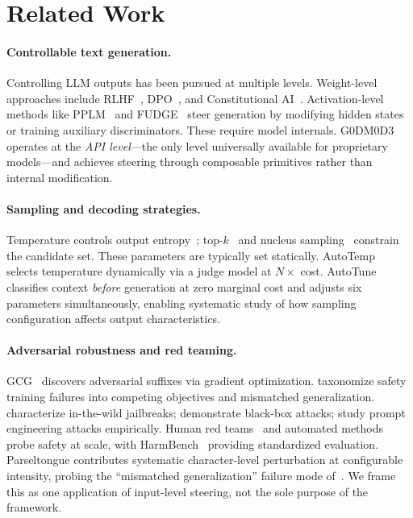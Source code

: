 \documentclass[11pt]{article}
\begin{document}
\section{Related Work}

\paragraph{Controllable text generation.}
Controlling LLM outputs has been pursued at multiple levels. Weight-level approaches include RLHF~\cite{ouyang2022training,stiennon2020learning}, DPO~\cite{rafailov2023direct}, and Constitutional AI~\cite{bai2022constitutional}. Activation-level methods like PPLM~\cite{dathathri2020plug} and FUDGE~\cite{yang2021fudge} steer generation by modifying hidden states or training auxiliary discriminators. These require model internals. G0DM0D3 operates at the \emph{API level}---the only level universally available for proprietary models---and achieves steering through composable primitives rather than internal modification.

\paragraph{Sampling and decoding strategies.}
Temperature controls output entropy~\cite{ackley1985learning}; top-$k$~\cite{fan2018hierarchical} and nucleus sampling~\cite{holtzman2020curious} constrain the candidate set. These parameters are typically set statically. AutoTemp~\cite{plinius2024autotemp} selects temperature dynamically via a judge model at $N\times$ cost. AutoTune classifies context \emph{before} generation at zero marginal cost and adjusts six parameters simultaneously, enabling systematic study of how sampling configuration affects output characteristics.

\paragraph{Adversarial robustness and red teaming.}
GCG~\cite{zou2023universal} discovers adversarial suffixes via gradient optimization. \citet{wei2023jailbroken} taxonomize safety training failures into competing objectives and mismatched generalization. \citet{shen2024anything} characterize in-the-wild jailbreaks; \citet{chao2023jailbreaking} demonstrate black-box attacks; \citet{liu2024jailbreaking} study prompt engineering attacks empirically. Human red teams~\cite{ganguli2022red} and automated methods~\cite{perez2022red} probe safety at scale, with HarmBench~\cite{mazeika2024harmbench} providing standardized evaluation. Parseltongue contributes systematic character-level perturbation at configurable intensity, probing the ``mismatched generalization'' failure mode of~\citet{wei2023jailbroken}. We frame this as one application of input-level steering, not the sole purpose of the framework.
\end{document}
